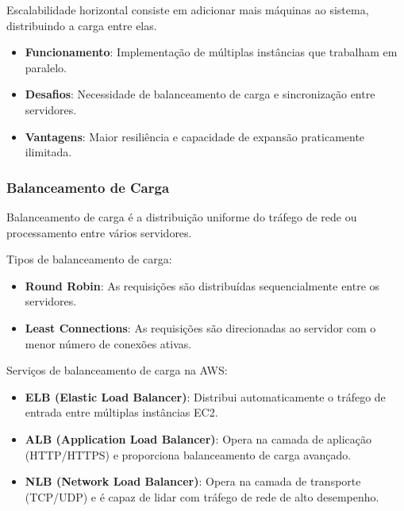 Escalabilidade horizontal consiste em adicionar mais máquinas ao sistema, distribuindo a carga entre elas.

\begin{itemize}
    \item \textbf{Funcionamento}: Implementação de múltiplas instâncias que trabalham em paralelo.
    \item \textbf{Desafios}: Necessidade de balanceamento de carga e sincronização entre servidores.
    \item \textbf{Vantagens}: Maior resiliência e capacidade de expansão praticamente ilimitada.
\end{itemize}

\subsubsection{Balanceamento de Carga}

Balanceamento de carga é a distribuição uniforme do tráfego de rede ou processamento entre vários servidores.

Tipos de balanceamento de carga:

\begin{itemize}
    \item \textbf{Round Robin}: As requisições são distribuídas sequencialmente entre os servidores.
    \item \textbf{Least Connections}: As requisições são direcionadas ao servidor com o menor número de conexões ativas.
\end{itemize}

Serviços de balanceamento de carga na AWS:

\begin{itemize}
    \item \textbf{ELB (Elastic Load Balancer)}: Distribui automaticamente o tráfego de entrada entre múltiplas instâncias EC2.
    \item \textbf{ALB (Application Load Balancer)}: Opera na camada de aplicação (HTTP/HTTPS) e proporciona balanceamento de carga avançado.
    \item \textbf{NLB (Network Load Balancer)}: Opera na camada de transporte (TCP/UDP) e é capaz de lidar com tráfego de rede de alto desempenho.
\end{itemize}

